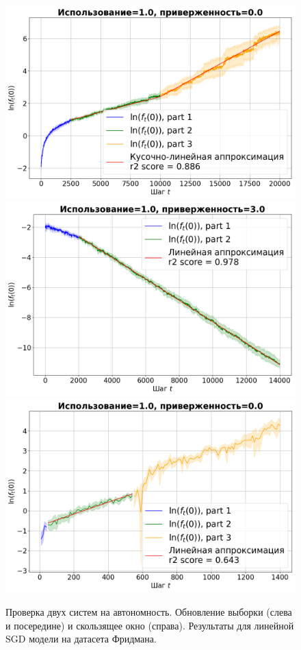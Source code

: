     \begin{figure}[h!]
        \centering
        \includegraphics[width=0.32\linewidth]{pictures/aut_su_friedman_sgd_model_50_1.0_0.0.png}
        \includegraphics[width=0.32\linewidth]{pictures/aut_su_friedman_sgd_model_50_1.0_3.0.png}
        \includegraphics[width=0.32\linewidth]{pictures/aut_sw_friedman_sgd_model_50_1.0_0.0.png}
        
        \caption{Проверка двух систем на автономность. Обновление выборки (слева и посередине) и скользящее окно (справа). Результаты для линейной SGD модели на датасета Фридмана.}
        \label{fig_exp_4_2}
    \end{figure}

